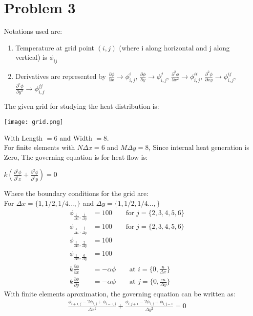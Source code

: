 \documentclass{article}
\begin{document}
\section{Problem 3}
Notations used are:
\begin{enumerate}
    \item Temperature at grid point $(i, j)$ (where i along horizontal and j along vertical) is $\phi_{ij}$
    \item Derivatives are represented by $\frac{\partial \phi}{\partial x} \rightarrow \phi^{i}_{i,j}$, $\frac{\partial \phi}{\partial y} \rightarrow \phi^{j}_{i,j}$, $\frac{\partial ^2 \phi}{\partial x^2} \rightarrow \phi^{ii}_{i,j}$, $\frac{\partial ^2 \phi}{\partial xy} \rightarrow \phi^{ij}_{i,j}$, $\frac{\partial ^2 \phi}{\partial y^2} \rightarrow \phi^{jj}_{i,j}$
\end{enumerate}
The given grid for studying the heat distribution is:\\
\centerline{\texttt{[image: grid.png]}}
With Length $=6$ and Width $=8$.\\
For finite elements with $N\Delta x = 6$ and $M\Delta y = 8$, 
Since internal heat generation is Zero, The governing equation is for heat flow is:\\
\centerline{$k\left(\frac{\partial ^2 \phi}{\partial ^2 x} + \frac{\partial ^2 \phi}{\partial ^2 y}\right) = 0$}
Where the boundary conditions for the grid are:\\
For $\Delta x =\{1, 1/2,1/4..., \}$ and $\Delta y =\{1, 1/2,1/4..., \}$\\
\begin{align}
      \phi_{\frac{2}{\Delta x}, \frac{j}{\Delta y}} &= 100 \qquad \text{for $j = \{2, 3, 4, 5, 6\}$} \\
      \phi_{\frac{4}{\Delta x}, \frac{j}{\Delta y}} &= 100 \qquad \text{for $j = \{2, 3, 4, 5, 6\}$} \\
      \phi_{\frac{3}{\Delta x}, \frac{2}{\Delta y}} &= 100 \\
      \phi_{\frac{3}{\Delta x}, \frac{6}{\Delta y}} &= 100 \\
      k\frac{\partial \phi}{\partial x} &= -\alpha \phi \qquad \text{at $i=\{0, \frac{n}{\Delta x}\}$}\\ 
      k\frac{\partial \phi}{\partial y} &= -\alpha \phi \qquad \text{at $j=\{0, \frac{m}{\Delta y}\}$}
\end{align}
With finite elements aproximation, the governing equation can be written as:\\
\begin{align}
    \frac{\phi_{i+1, j} - 2\phi_{i, j} + \phi_{i-1, j}}{\Delta x^2} + \frac{\phi_{i, j+1} - 2\phi_{i, j} + \phi_{i, j-1}}{\Delta y^2} = 0 \nonumber
\end{align}
\end{document}
